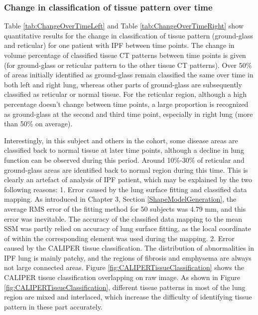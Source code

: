 \subsubsection{Change in classification of tissue pattern over time}
Table \ref{tab:ChangeOverTimeLeft} and Table \ref{tab:ChangeOverTimeRight} show quantitative results for the change in classification of tissue pattern (ground-glass and reticular) for one patient with IPF between time points. The change in volume percentage of classified tissue CT patterns between time points is given (for ground-glass or reticular pattern to the other tissue CT patterns). Over 50\% of areas initially identified as ground-glass remain classified the same over time in both left and right lung, whereas other parts of ground-glass are subsequently classified as reticular or normal tissue. For the reticular region, although a high percentage doesn't change between time points, a large proportion is recognized as ground-glass at the second and third time point, especially in right lung (more than 50\% on average). 

Interestingly, in this subject and others in the cohort, some disease areas are classified back to normal tissue at later time points, although a decline in lung function can be observed during this period. Around 10\%-30\% of reticular and ground-glass areas are identified back to normal region during this time. This is clearly an artefact of analysis of IPF patient, which may be explained by the two following reasons: 1. Error caused by the lung surface fitting and classified data mapping. As introduced in Chapter 3, Section \ref{ShapeModelGeneration}, the average RMS error of the fitting method for 50 subjects was 4.79 mm, and this error was inevitable. The accuracy of the classified data mapping to the mean SSM was partly relied on accuracy of lung surface fitting, as the local coordinate of within the corresponding element was used during the mapping. 2. Error caused by the CALIPER tissue classification. The distribution of abnormalities in IPF lung is mainly patchy, and the regions of fibrosis and emphysema are always not large connected areas. Figure \ref{fig:CALIPERTissueClassification} shows the CALIPER tissue classification overlapping on raw image. As shown in Figure \ref{fig:CALIPERTissueClassification}, different tissue patterns in most of the lung region are mixed and interlaced, which increase the difficulty of identifying tissue pattern in these part accurately.

